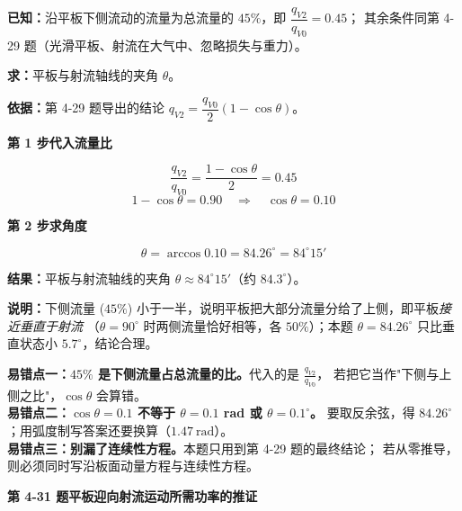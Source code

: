 \begin{jie}
\textbf{已知：}沿平板下侧流动的流量为总流量的 $45\%$，即 $\dfrac{q_{V2}}{q_{V0}}=0.45$；
其余条件同第 4-29 题（光滑平板、射流在大气中、忽略损失与重力）。

\textbf{求：}平板与射流轴线的夹角 $\theta$。

\textbf{依据：}第 4-29 题导出的结论 $q_{V2}=\dfrac{q_{V0}}{2}\left(1-\cos\theta\right)$。

\textbf{第 1 步\quad 代入流量比}

\[ \frac{q_{V2}}{q_{V0}}=\frac{1-\cos\theta}{2}=0.45 \]
\[ 1-\cos\theta=0.90\quad\Longrightarrow\quad \cos\theta=0.10 \]

\textbf{第 2 步\quad 求角度}

\[ \theta=\arccos0.10=84.26^\circ=84^\circ15' \]

\textbf{结果：}平板与射流轴线的夹角 $\theta\approx84^\circ15'$（约 $84.3^\circ$）。

\textbf{说明：}下侧流量 ($45\%$) 小于一半，说明平板把大部分流量分给了上侧，即平板\emph{接近垂直于射流}
（$\theta=90^\circ$ 时两侧流量恰好相等，各 $50\%$）；本题 $\theta=84.26^\circ$ 只比垂直状态小 $5.7^\circ$，结论合理。
\end{jie}

\begin{yicuo}
\textbf{易错点一：$45\%$ 是下侧流量占总流量的比。}代入的是 $\frac{q_{V2}}{q_{V0}}$，
若把它当作"下侧与上侧之比"，$\cos\theta$ 会算错。\\
\textbf{易错点二：$\cos\theta=0.1$ 不等于 $\theta=0.1$ rad 或 $\theta=0.1^\circ$。}
要取反余弦，得 $84.26^\circ$；用弧度制写答案还要换算（$1.47\ \mathrm{rad}$）。\\
\textbf{易错点三：别漏了连续性方程。}本题只用到第 4-29 题的最终结论；
若从零推导，则必须同时写沿板面动量方程与连续性方程。
\end{yicuo}

\noindent\textbf{第 4-31 题\quad 平板迎向射流运动所需功率的推证}

